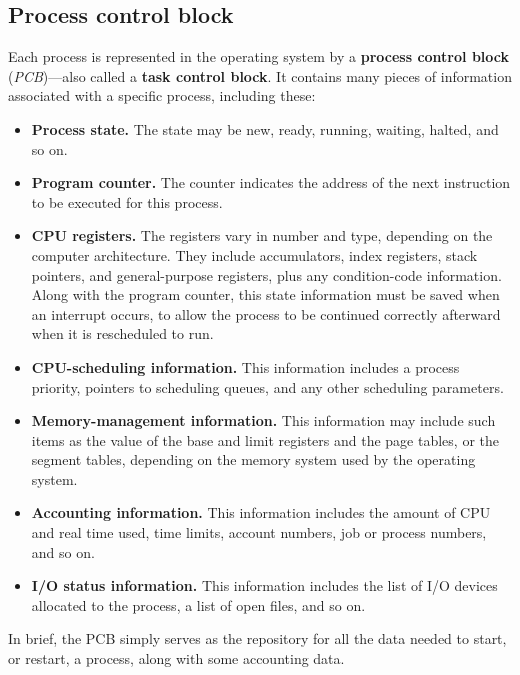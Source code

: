 \subsection*{Process control block}\label{sec:3.1:process_control_block}
Each process is represented in the operating system by a \textbf{process control block} (\textit{PCB})---also called a \textbf{task control block}. It contains many pieces of information associated with a specific process, including these:
\begin{itemize}
    \item \textbf{Process state.} The state may be new, ready, running, waiting, halted, and so on.
    \item \textbf{Program counter.} The counter indicates the address of the next instruction to be executed for this process.
    \item \textbf{CPU registers.} The registers vary in number and type, depending on the computer architecture. They include accumulators, index registers, stack pointers, and general-purpose registers, plus any condition-code information. Along with the program counter, this state information must be saved when an interrupt occurs, to allow the process to be continued correctly afterward when it is rescheduled to run.
    \item \textbf{CPU-scheduling information.} This information includes a process priority, pointers to scheduling queues, and any other scheduling parameters.
    \item \textbf{Memory-management information.} This information may include such items as the value of the base and limit registers and the page tables, or the segment tables, depending on the memory system used by the operating system.
    \item \textbf{Accounting information.} This information includes the amount of CPU and real time used, time limits, account numbers, job or process numbers, and so on.
    \item \textbf{I/O status information.} This information includes the list of I/O devices allocated to the process, a list of open files, and so on.
\end{itemize}
In brief, the PCB simply serves as the repository for all the data needed to start, or restart, a process, along with some accounting data.

